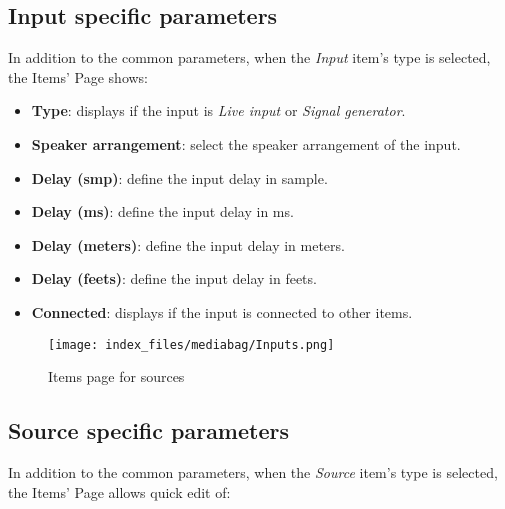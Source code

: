 \documentclass[
  letterpaper,
  DIV=11,
  numbers=noendperiod]{scrreport}
\providecommand{\tightlist}{%
  \setlength{\itemsep}{0pt}\setlength{\parskip}{0pt}}\usepackage{longtable,booktabs,array}
\begin{document}
\hypertarget{input-specific-parameters}{%
\subsection{Input specific parameters}\label{input-specific-parameters}}

In addition to the common parameters, when the \emph{Input} item's type
is selected, the Items' Page shows:

\begin{itemize}
\tightlist
\item
  \textbf{Type}: displays if the input is \emph{Live input} or
  \emph{Signal generator}.
\item
  \textbf{Speaker arrangement}: select the speaker arrangement of the
  input.
\item
  \textbf{Delay (smp)}: define the input delay in sample.
\item
  \textbf{Delay (ms)}: define the input delay in ms.
\item
  \textbf{Delay (meters)}: define the input delay in meters.
\item
  \textbf{Delay (feets)}: define the input delay in feets.
\item
  \textbf{Connected}: displays if the input is connected to other items.
\end{itemize}

\begin{figure}

{\centering \texttt{[image: index\_files/mediabag/Inputs.png]}

}

\caption{Items page for sources}

\end{figure}

\hypertarget{source-specific-parameters}{%
\subsection{Source specific
parameters}\label{source-specific-parameters}}

In addition to the common parameters, when the \emph{Source} item's type
is selected, the Items' Page allows quick edit of:
\end{document}
